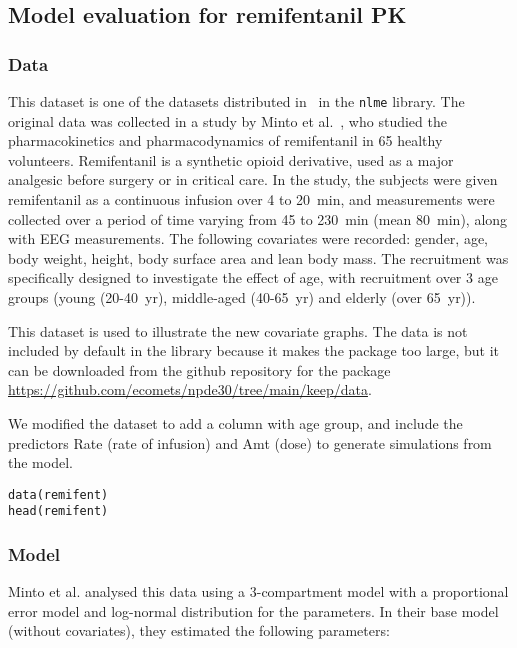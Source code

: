 
\clearpage
\subsection{Model evaluation for remifentanil PK} \label{sec:remifentanil}

\subsubsection{Data}

\hskip 18pt This dataset is one of the datasets distributed in \R~in the \texttt{nlme} library. The original data was collected in a study by Minto et al.~\cite{Minto97a,Minto97b}, who studied the pharmacokinetics and pharmacodynamics of remifentanil in 65 healthy volunteers. Remifentanil is a synthetic opioid derivative, used as a major analgesic before surgery or in critical care. In the study, the subjects were given remifentanil as a continuous infusion over 4 to 20~min, and measurements were collected over a period of time varying from 45 to 230~min (mean 80~min), along with EEG measurements. The following covariates were recorded: gender, age, body weight, height, body surface area and lean body mass. The recruitment was specifically designed to investigate the effect of age, with recruitment over 3 age groups (young (20-40~yr), middle-aged (40-65~yr) and elderly (over 65~yr)).

This dataset is used to illustrate the new covariate graphs. The data is not included by default in the library because it makes the package too large, but it can be downloaded from the github repository for the package \url{https://github.com/ecomets/npde30/tree/main/keep/data}.

We modified the dataset to add a column with age group, and include the predictors {\sf Rate} (rate of infusion) and {\sf Amt} (dose) to generate simulations from the model.
\begin{verbatim}
data(remifent)
head(remifent)
\end{verbatim} 

\subsubsection{Model}

\hskip 18pt Minto et al. analysed this data using a 3-compartment model with a proportional error model and log-normal distribution for the parameters. In their base model (without covariates), they estimated the following parameters:

